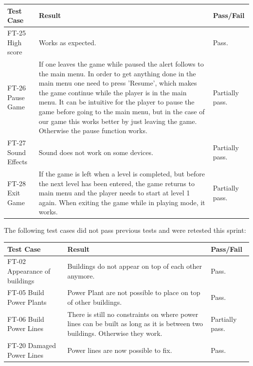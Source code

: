 	\begin{tabular}{| p{3cm} | p{7cm} | p{2cm} |}
		\hline
		\rowcolor{lightgray}
		{\bf Test Case} & {\bf Result} & {\bf Pass/Fail} \\ \hline

		FT-25 High score & Works as expected. & Pass. \\ \hline

		FT-26 Pause Game & If one leaves the game while paused the alert follows to the main menu. In order 
		to get anything done in the main menu one need to press 'Resume', which makes the game continue while 
		the player is in the main menu. It can be intuitive for the player to pause the game before going to 
		the main menu, but in the case of our game this works better by just leaving the game. Otherwise the 
		pause function works. & Partially pass. \\ \hline

		FT-27 Sound Effects & Sound does not work on some devices. & Partially pass. \\ \hline

		FT-28 Exit Game & If the game is left when a level is completed, but before the next level has been 
		entered, the game returns to main menu and the player needs to start at level 1 again. When exiting 
		the game while in playing mode, it works. & Partially pass. \\ \hline



	\end{tabular}

	The following test cases did not pass previous tests and were retested this sprint:

	\begin{tabular}{| p{3cm} | p{7cm} | p{2cm} |}
		\hline
		\rowcolor{lightgray}
		{\bf Test Case} & {\bf Result} & {\bf Pass/Fail} \\ \hline
		FT-02 Appearance of buildings & Buildings do not appear on top of each other anymore. & Pass. \\ \hline
		FT-05 Build Power Plants & Power Plant are not possible to place on top of other buildings. & Pass. \\ \hline
		FT-06 Build Power Lines & There is still no constraints on where power lines can be built as long as it is between two buildings. Otherwise they work. & Partially pass. \\ \hline
		FT-20 Damaged Power Lines & Power lines are now possible to fix. & Pass. \\ \hline
	\end{tabular}

